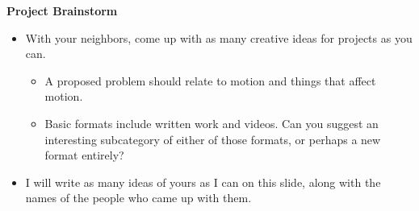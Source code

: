 \documentclass[]{article}
\begin{document}
\newpage
\begin{TeacherMargin}

\end{TeacherMargin}
\begin{PresentSpace}
\textbf{Project Brainstorm}
\begin{itemize}
	\item With your neighbors, come up with as many creative ideas for projects as you can.
	\begin{itemize}
		\item A proposed problem should relate to motion and things that affect motion.
		\item Basic formats include written work and videos. Can you suggest an interesting subcategory of either of those formats, or perhaps a new format entirely?
	\end{itemize}
	\item I will write as many ideas of yours as I can on this slide, along with the names of the people who came up with them.
\end{itemize}
\end{PresentSpace}
\newpage
\end{document}

